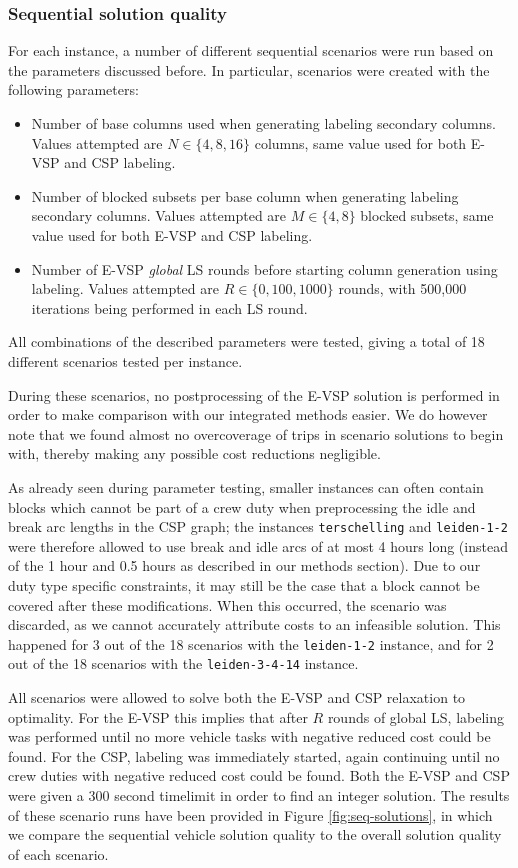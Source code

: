 \documentclass[]{article}
\begin{document}
\subsubsection{Sequential solution quality}
For each instance, a number of different sequential scenarios were run based on the parameters discussed before. In particular, scenarios were created with the following parameters:
\begin{itemize}
  \item Number of base columns used when generating labeling secondary columns. Values attempted are $N \in \{ 4, 8, 16 \}$ columns, same value used for both E-VSP and CSP labeling. 
  \item Number of blocked subsets per base column when generating labeling secondary columns. Values attempted are $M \in \{ 4, 8 \}$ blocked subsets, same value used for both E-VSP and CSP labeling. 
  \item Number of E-VSP \emph{global} LS rounds before starting column generation using labeling. Values attempted are $R \in \{ 0, 100, 1000 \}$ rounds, with 500,000 iterations being performed in each LS round. 
\end{itemize}
All combinations of the described parameters were tested, giving a total of 18 different scenarios tested per instance. 

During these scenarios, no postprocessing of the E-VSP solution is performed in order to make comparison with our integrated methods easier. We do however note that we found almost no overcoverage of trips in scenario solutions to begin with, thereby making any possible cost reductions negligible. 

As already seen during parameter testing, smaller instances can often contain blocks which cannot be part of a crew duty when preprocessing the idle and break arc lengths in the CSP graph; the instances \texttt{terschelling} and \texttt{leiden-1-2} were therefore allowed to use break and idle arcs of at most 4 hours long (instead of the 1 hour and 0.5 hours as described in our methods section). Due to our duty type specific constraints, it may still be the case that a block cannot be covered after these modifications. When this occurred, the scenario was discarded, as we cannot accurately attribute costs to an infeasible solution. This happened for 3 out of the 18 scenarios with the \texttt{leiden-1-2} instance, and for 2 out of the 18 scenarios with the \texttt{leiden-3-4-14} instance.  

All scenarios were allowed to solve both the E-VSP and CSP relaxation to optimality. For the E-VSP this implies that after $R$ rounds of global LS, labeling was performed until no more vehicle tasks with negative reduced cost could be found. For the CSP, labeling was immediately started, again continuing until no crew duties with negative reduced cost could be found. Both the E-VSP and CSP were given a 300 second timelimit in order to find an integer solution. The results of these scenario runs have been provided in Figure \ref{fig:seq-solutions}, in which we compare the sequential vehicle solution quality to the overall solution quality of each scenario.
\end{document}
